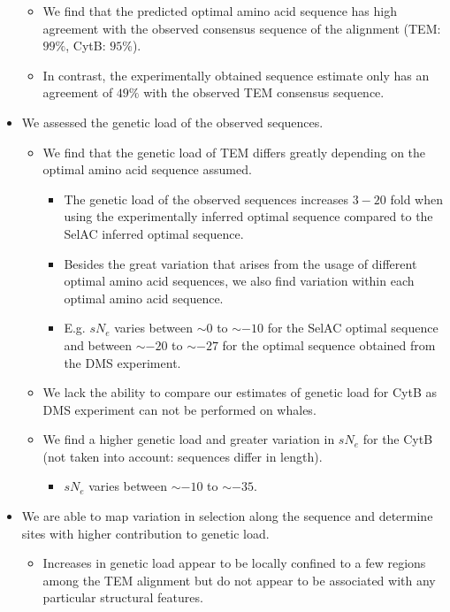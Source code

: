 \documentclass[12pt]{article}
\begin{document}
\begin{itemize}
\begin{itemize}
		\item We find that the predicted optimal amino acid sequence has high agreement with the observed consensus sequence of the alignment (TEM: $99 \%$, CytB: $95 \%$).
		\item In contrast, the experimentally obtained sequence estimate only has an agreement of $49 \%$ with the observed TEM consensus sequence.
	\end{itemize}
	\item We assessed the genetic load of the observed sequences.
	\begin{itemize}
		\item We find that the genetic load of TEM differs greatly depending on the optimal amino acid sequence assumed.
		\begin{itemize}
			\item The genetic load of the observed sequences increases $3-20$ fold when using the experimentally inferred optimal sequence compared to the SelAC inferred optimal sequence.
			\item Besides the great variation that arises from the usage of different optimal amino acid sequences, we also find variation within each optimal amino acid sequence.
			\item E.g. $sN_e$ varies between $\sim0$ to $\sim-10$ for the SelAC optimal sequence and between $\sim -20$ to $\sim -27$ for the optimal sequence obtained from the DMS experiment.
		\end{itemize}
		\item We lack the ability to compare our estimates of genetic load for CytB as DMS experiment can not be performed on whales.
		\item We find a higher genetic load and greater variation in $sN_e$ for the CytB (not taken into account: sequences differ in length).
		\begin{itemize}
			\item $sN_e$ varies between $\sim -10$ to $\sim -35$.
		\end{itemize}
	\end{itemize}
	\item We are able to map variation in selection along the sequence and determine sites with higher contribution to genetic load.
	\begin{itemize}
		\item Increases in genetic load appear to be locally confined to a few regions among the TEM alignment but do not appear to be associated with any particular structural features.

\end{itemize}
\end{itemize}
\end{document}
